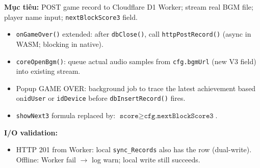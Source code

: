 \documentclass[12pt,a4paper]{article}
\begin{document}
\textbf{Mục tiêu:} POST game record to Cloudflare D1 Worker; stream real BGM
file; player name input; \texttt{nextBlockScore3} field.

\begin{itemize}[nosep]
  \item \texttt{onGameOver()} extended: after \texttt{dbClose()},
        call \texttt{httpPostRecord()} (async in WASM; blocking in native).
  \item \texttt{coreOpenBgm()}: queue actual audio samples from
        \texttt{cfg.bgmUrl} (new V3 field) into existing stream.
  \item Popup GAME OVER: background job to trace the latest achievement based on\texttt{idUser} or \texttt{idDevice}
        before \texttt{dbInsertRecord()} fires.
  \item \texttt{showNext3} formula replaced by:
        $\texttt{score} \geq \texttt{cfg.nextBlockScore3}$.
\end{itemize}

\noindent\textbf{I/O validation:}
\begin{itemize}[nosep]
  \item HTTP 201 from Worker: local \texttt{sync\_Records} also has the row
        (dual-write). Offline: Worker fail $\rightarrow$ log warn; local write still succeeds.
\end{itemize}

\label{LastPageGameCoreEngineering}
\end{document}
